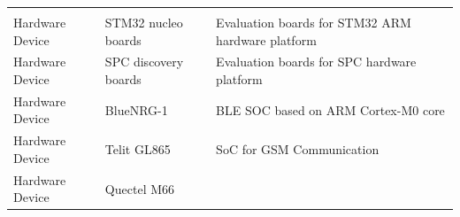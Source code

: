 \documentclass[]{book}
\begin{document}
\begin{longtable}[]{@{}lll@{}}
\begin{minipage}[t]{0.64\columnwidth}
\end{minipage}\tabularnewline
\begin{minipage}[t]{0.13\columnwidth}\raggedright\strut
Hardware Device\strut
\end{minipage} & \begin{minipage}[t]{0.13\columnwidth}\raggedright\strut
STM32 nucleo boards\strut
\end{minipage} & \begin{minipage}[t]{0.64\columnwidth}\raggedright\strut
Evaluation boards for STM32 ARM hardware platform\strut
\end{minipage}\tabularnewline
\begin{minipage}[t]{0.13\columnwidth}\raggedright\strut
Hardware Device\strut
\end{minipage} & \begin{minipage}[t]{0.13\columnwidth}\raggedright\strut
SPC discovery boards\strut
\end{minipage} & \begin{minipage}[t]{0.64\columnwidth}\raggedright\strut
Evaluation boards for SPC hardware platform\strut
\end{minipage}\tabularnewline
\begin{minipage}[t]{0.13\columnwidth}\raggedright\strut
Hardware Device\strut
\end{minipage} & \begin{minipage}[t]{0.13\columnwidth}\raggedright\strut
BlueNRG-1\strut
\end{minipage} & \begin{minipage}[t]{0.64\columnwidth}\raggedright\strut
BLE SOC based on ARM Cortex-M0 core\strut
\end{minipage}\tabularnewline
\begin{minipage}[t]{0.13\columnwidth}\raggedright\strut
Hardware Device\strut
\end{minipage} & \begin{minipage}[t]{0.13\columnwidth}\raggedright\strut
Telit GL865\strut
\end{minipage} & \begin{minipage}[t]{0.64\columnwidth}\raggedright\strut
SoC for GSM Communication\strut
\end{minipage}\tabularnewline
\begin{minipage}[t]{0.13\columnwidth}\raggedright\strut
Hardware Device\strut
\end{minipage} & \begin{minipage}[t]{0.13\columnwidth}\raggedright\strut
Quectel M66\strut

\end{minipage}
\end{longtable}
\end{document}
